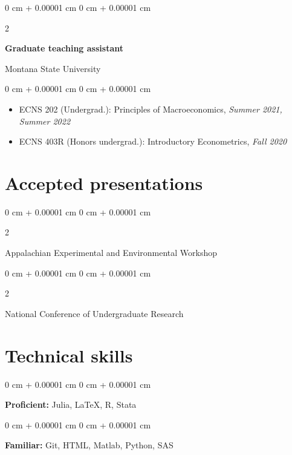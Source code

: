 \documentclass[11pt]{article}
\newenvironment{highlights}{
	\begin{itemize}[
		topsep=0.10 cm,
		parsep=0.10 cm,
		partopsep=0pt,
		itemsep=0pt,
		leftmargin=0 cm + 10pt
		]
	}{
	\end{itemize}
} %
\newenvironment{onecolentry}{
	\begin{adjustwidth}{
			0 cm + 0.00001 cm
		}{
			0 cm + 0.00001 cm
		}
	}{
	\end{adjustwidth}
} %
\newenvironment{twocolentry}[2][]{
	\onecolentry
	\def\secondColumn{#2}
	\setcolumnwidth{\fill, 4.5 cm}
	\begin{paracol}{2}
	}{
		\switchcolumn \raggedleft \secondColumn
	\end{paracol}
	\endonecolentry
} %
\begin{document}
\vspace{0.10 cm}

\begin{twocolentry}{Montana State University}
	\textbf{Graduate teaching assistant}
\end{twocolentry}
\begin{onecolentry}
	\begin{highlights}
		\item ECNS 202 (Undergrad.): Principles of Macroeconomics, \textit{Summer 2021, Summer 2022}
		\item ECNS 403R (Honors undergrad.): Introductory Econometrics, \textit{Fall 2020}
	\end{highlights}
\end{onecolentry}


\section{Accepted presentations}

\begin{twocolentry}{2024}
	Appalachian Experimental and Environmental Workshop
\end{twocolentry}
\begin{twocolentry}{2020}
	National Conference of Undergraduate Research
\end{twocolentry}


\section{Technical skills}


\begin{onecolentry}
	\textbf{Proficient:} Julia, \LaTeX, R, Stata
\end{onecolentry}
\begin{onecolentry}
	\textbf{Familiar:} Git, HTML, Matlab, Python, SAS
\end{onecolentry}
	
\end{document}
